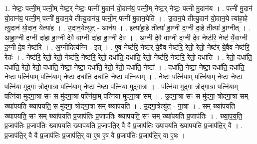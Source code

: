 \documentclass[17pt]{extarticle}
\begin{document}
1. नेष्टः॒ पत्नी॒म् पत्नी॒म् नेष्ट॒र् नेष्टः॒ पत्नी॑ मु॒दान॑ यो॒दान॑य॒ पत्नी॒म् नेष्ट॒र् नेष्टः॒ पत्नी॑ मु॒दान॑य । . पत्नी॑ मु॒दान॑ यो॒दान॑य॒ पत्नी॒म् पत्नी॑ मु॒दान॒ये तीत्यु॒दान॑य॒ पत्नी॒म् पत्नी॑ मु॒दान॒येति॑ । . उ॒दान॒ये तीत्यु॒दान॑ यो॒दान॒ये त्या॑हा॒हे त्यु॒दान॑ यो॒दान॒ येत्या॑ह । . उ॒दान॒येत्यु॑त् - आन॑य । . इत्या॑हा॒हे तीत्या॑ हा॒ग्नी द॒ग्नी दा॒हे तीत्या॑ हा॒ग्नीत् । . आ॒हा॒ग्नी द॒ग्नी दा॑हा हा॒ग्नी दे॒वै वाग्नी दा॑हा हा॒ग्नी दे॒व । . अ॒ग्नी दे॒वै वाग्नी द॒ग्नी दे॒व नेष्ट॑रि॒ नेष्ट॑ र्ये॒वाग्नी द॒ग्नी दे॒व नेष्ट॑रि । . अ॒ग्नीदित्य॑ग्नि - इत् । . ए॒व नेष्ट॑रि॒ नेष्ट॑र् ये॒वैव नेष्ट॑रि॒ रेतो॒ रेतो॒ नेष्ट॑र् ये॒वैव नेष्ट॑रि॒ रेतः॑ । . नेष्ट॑रि॒ रेतो॒ रेतो॒ नेष्ट॑रि॒ नेष्ट॑रि॒ रेतो॒ दधा॑ति॒ दधा॑ति॒ रेतो॒ नेष्ट॑रि॒ नेष्ट॑रि॒ रेतो॒ दधा॑ति । . रेतो॒ दधा॑ति॒ दधा॑ति॒ रेतो॒ रेतो॒ दधा॑ति॒ नेष्टा॒ नेष्टा॒ दधा॑ति॒ रेतो॒ रेतो॒ दधा॑ति॒ नेष्टा᳚ । . दधा॑ति॒ नेष्टा॒ नेष्टा॒ दधा॑ति॒ दधा॑ति॒ नेष्टा॒ पत्नि॑या॒म् पत्नि॑या॒म् नेष्टा॒ दधा॑ति॒ दधा॑ति॒ नेष्टा॒ पत्नि॑याम् । . नेष्टा॒ पत्नि॑या॒म् पत्नि॑या॒म् नेष्टा॒ नेष्टा॒ पत्नि॑या मुद्‍गा॒ त्रोद्‍गा॒त्रा पत्नि॑या॒म् नेष्टा॒ नेष्टा॒ पत्नि॑या मुद्‍गा॒त्रा । . पत्नि॑या मुद्‍गा॒ त्रोद्‍गा॒त्रा पत्नि॑या॒म् पत्नि॑या मुद्‍गा॒त्रा सꣳ स मु॑द्‍गा॒त्रा पत्नि॑या॒म् पत्नि॑या मुद्‍गा॒त्रा सम् । . उ॒द्‍गा॒त्रा सꣳ स मु॑द्‍गा॒ त्रोद्‍गा॒त्रा सम् ख्या॑पयति ख्यापयति॒ स मु॑द्‍गा॒ त्रोद्‍गा॒त्रा सम् ख्या॑पयति । . उ॒द्‍गा॒त्रेत्यु॑त् - गा॒त्रा । . सम् ख्या॑पयति ख्यापयति॒ सꣳ सम् ख्या॑पयति प्र॒जाप॑तिः प्र॒जाप॑तिः ख्यापयति॒ सꣳ सम् ख्या॑पयति प्र॒जाप॑तिः । . ख्या॒प॒य॒ति॒ प्र॒जाप॑तिः प्र॒जाप॑तिः ख्यापयति ख्यापयति प्र॒जाप॑ति॒र् वै वै प्र॒जाप॑तिः ख्यापयति ख्यापयति प्र॒जाप॑ति॒र् वै । . प्र॒जाप॑ति॒र् वै वै प्र॒जाप॑तिः प्र॒जाप॑ति॒र् वा ए॒ष ए॒ष वै प्र॒जाप॑तिः प्र॒जाप॑ति॒र् वा ए॒षः । \newline
\end{document}
